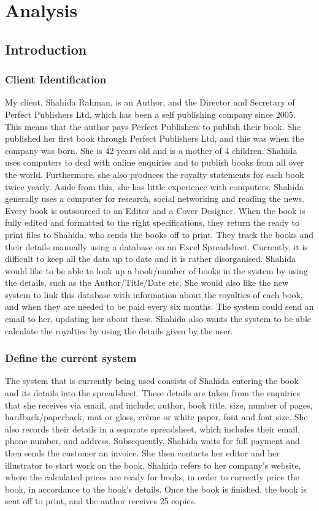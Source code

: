 
\chapter{Analysis}

\section{Introduction}

\subsection{Client Identification}
My client, Shahida Rahman, is an Author, and the Director and Secretary of Perfect Publishers Ltd, which has been a self publishing company since 2005. This means that the author pays Perfect Publishers to publish their book.
 She published her first book through Perfect Publishers Ltd, and this was when the company was born. She is 42 years old and is a mother of 4 children. Shahida uses computers to deal with online enquiries and to publish books from all over the world. Furthermore, she also produces the royalty statements for each book twice yearly. Aside from this, she has little experience with computers. Shahida generally uses a computer for research, social networking and reading the news. Every book is outsourced to an Editor and a Cover Designer. When the book is fully edited and formatted to the right specifications, they return the ready to print files to Shahida, who sends the books off to print. They track the books and their details manually using a database on an Excel Spreadsheet. Currently, it is difficult to keep all the data up to date and it is rather disorganised. Shahida would like to be able to look up a book/number of books in the system by using the details, such as the Author/Title/Date etc. She would also like the new system to link this database with information about the royalties of each book, and when they are needed to be paid every six months. The system could send an email to her, updating her about these. Shahida also wants the system to be able calculate the royalties by using the details given by the user.

\subsection{Define the current system}
The system that is currently being used consists of Shahida entering the book and its details into the spreadsheet. These details are taken from the enquiries that she receives via email, and include; author, book title, size, number of pages, hardback/paperback, mat or gloss, crème or white paper, font and font size. She also records their details in a separate spreadsheet, which includes their email, phone number, and address. Subsequently, Shahida waits for full payment and then sends the customer an invoice. She then contacts her editor and her illustrator to start work on the book. Shahida refers to her company's website, where the calculated prices are ready for books, in order to correctly price the book, in accordance to the book’s details. Once the book is finished, the book is sent off to print, and the author receives 25 copies.


